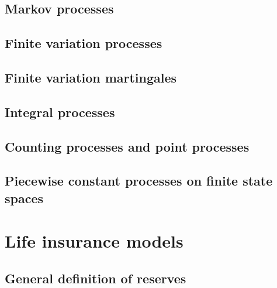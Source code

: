 \documentclass[a4paper,12pt,openany]{book}
\begin{document}
\hypertarget{markov-processes}{%
\subsection{Markov processes}\label{markov-processes}}

\hypertarget{finite-variation-processes}{%
\subsection{Finite variation processes}\label{finite-variation-processes}}

\hypertarget{finite-variation-martingales}{%
\subsection{Finite variation martingales}\label{finite-variation-martingales}}

\hypertarget{integral-processes}{%
\subsection{Integral processes}\label{integral-processes}}

\hypertarget{counting-processes-and-point-processes}{%
\subsection{Counting processes and point processes}\label{counting-processes-and-point-processes}}

\hypertarget{piecewise-constant-processes-on-finite-state-spaces}{%
\subsection{Piecewise constant processes on finite state spaces}\label{piecewise-constant-processes-on-finite-state-spaces}}

\hypertarget{life-insurance-models}{%
\section{Life insurance models}\label{life-insurance-models}}

\hypertarget{general-definition-of-reserves}{%
\subsection{General definition of reserves}\label{general-definition-of-reserves}}
\end{document}
